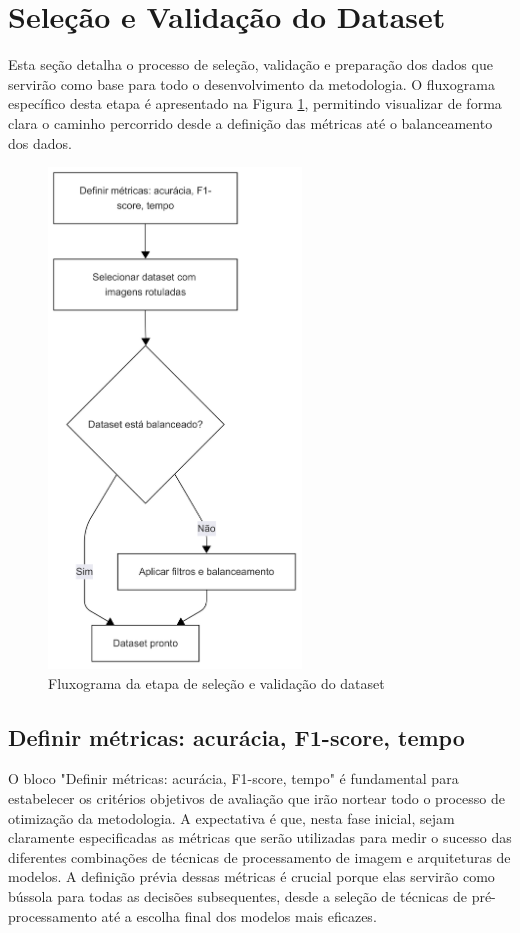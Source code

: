 \section{Seleção e Validação do Dataset}

Esta seção detalha o processo de seleção, validação e preparação dos dados que servirão como base para todo o desenvolvimento da metodologia. O fluxograma específico desta etapa é apresentado na Figura \ref{fig:fluxograma_selecao_dataset}, permitindo visualizar de forma clara o caminho percorrido desde a definição das métricas até o balanceamento dos dados.

\begin{figure}[H]
    \centering
    \caption{\label{fig:fluxograma_selecao_dataset}Fluxograma da etapa de seleção e validação do dataset}
    \includegraphics[width=0.6\textwidth]{img/metodologia - 1 - seleção e validação do dataset.png}
\end{figure}

\subsection{Definir métricas: acurácia, F1-score, tempo}
O bloco "Definir métricas: acurácia, F1-score, tempo" é fundamental para estabelecer os critérios objetivos de avaliação que irão nortear todo o processo de otimização da metodologia. A expectativa é que, nesta fase inicial, sejam claramente especificadas as métricas que serão utilizadas para medir o sucesso das diferentes combinações de técnicas de processamento de imagem e arquiteturas de modelos. A definição prévia dessas métricas é crucial porque elas servirão como bússola para todas as decisões subsequentes, desde a seleção de técnicas de pré-processamento até a escolha final dos modelos mais eficazes.

